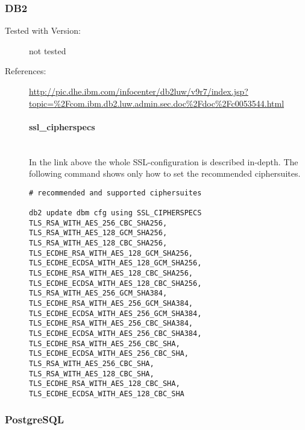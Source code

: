 \subsubsection{DB2}
\begin{description}
\item[Tested with Version:] not tested

\item[References:]
{\small \url{http://pic.dhe.ibm.com/infocenter/db2luw/v9r7/index.jsp?topic=%2Fcom.ibm.db2.luw.admin.sec.doc%2Fdoc%2Fc0053544.html}}


\paragraph*{ssl\_cipherspecs}\mbox{}\\
In the link above the whole SSL-configuration is described in-depth. The following command shows only how to set the recommended ciphersuites.
\begin{lstlisting}
# recommended and supported ciphersuites 

db2 update dbm cfg using SSL_CIPHERSPECS 
TLS_RSA_WITH_AES_256_CBC_SHA256,
TLS_RSA_WITH_AES_128_GCM_SHA256,
TLS_RSA_WITH_AES_128_CBC_SHA256,
TLS_ECDHE_RSA_WITH_AES_128_GCM_SHA256,
TLS_ECDHE_ECDSA_WITH_AES_128_GCM_SHA256,
TLS_ECDHE_RSA_WITH_AES_128_CBC_SHA256,
TLS_ECDHE_ECDSA_WITH_AES_128_CBC_SHA256,
TLS_RSA_WITH_AES_256_GCM_SHA384,
TLS_ECDHE_RSA_WITH_AES_256_GCM_SHA384,
TLS_ECDHE_ECDSA_WITH_AES_256_GCM_SHA384,
TLS_ECDHE_RSA_WITH_AES_256_CBC_SHA384,
TLS_ECDHE_ECDSA_WITH_AES_256_CBC_SHA384,
TLS_ECDHE_RSA_WITH_AES_256_CBC_SHA,
TLS_ECDHE_ECDSA_WITH_AES_256_CBC_SHA,
TLS_RSA_WITH_AES_256_CBC_SHA,
TLS_RSA_WITH_AES_128_CBC_SHA,
TLS_ECDHE_RSA_WITH_AES_128_CBC_SHA,
TLS_ECDHE_ECDSA_WITH_AES_128_CBC_SHA

\end{lstlisting}

\end{description}


\subsubsection{PostgreSQL}

